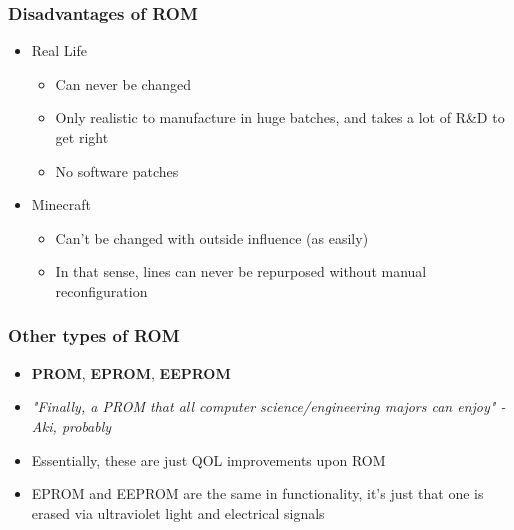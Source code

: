 \documentclass{beamer}
\begin{document}
             \begin{frame}
             	\frametitle{Disadvantages of ROM}
             	\begin{itemize}
             		\item Real Life
             		\begin{itemize}
             			\item Can never be changed
             			\item Only realistic to manufacture in huge batches, and takes a lot of R\&D to get right
             			\item No software patches
             		\end{itemize}
             		\item Minecraft
             		\begin{itemize}
             			\item Can't be changed with outside influence (as easily)
             			\item In that sense, lines can never be repurposed without manual reconfiguration
             		\end{itemize}
             	\end{itemize}
             	
             \end{frame}
             
             \begin{frame}
             	\frametitle{Other types of ROM}
             	\begin{itemize}
             		\item \textbf{PROM}, \textbf{EPROM}, \textbf{EEPROM}
             		\item \textit{"Finally, a PROM that all computer science/engineering majors can enjoy" \newline -Aki, probably}
             		\item Essentially, these are just QOL improvements upon ROM
             		\item EPROM and EEPROM are the same in functionality, it's just that one is erased via ultraviolet light and  electrical signals
             	\end{itemize}
             \end{frame}
             
\end{document}
